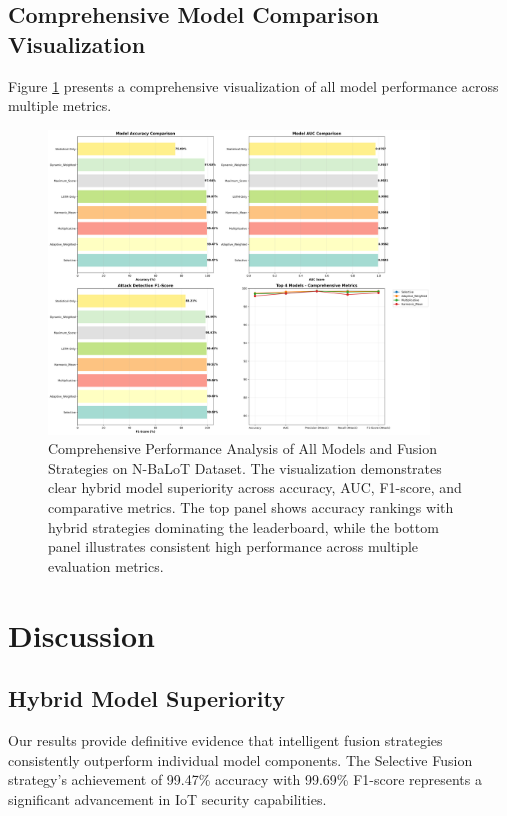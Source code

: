 \documentclass[conference]{IEEEtran}
\begin{document}
\subsection{Comprehensive Model Comparison Visualization}

Figure \ref{fig:nbalot_results} presents a comprehensive visualization of all model performance across multiple metrics.

\begin{figure}[!t]
\centering
\includegraphics[width=0.9\textwidth]{comprehensive_hybrid_results.png}
\caption{Comprehensive Performance Analysis of All Models and Fusion Strategies on N-BaLoT Dataset. The visualization demonstrates clear hybrid model superiority across accuracy, AUC, F1-score, and comparative metrics. The top panel shows accuracy rankings with hybrid strategies dominating the leaderboard, while the bottom panel illustrates consistent high performance across multiple evaluation metrics.}
\label{fig:nbalot_results}
\end{figure}

\section{Discussion}

\subsection{Hybrid Model Superiority}

Our results provide definitive evidence that intelligent fusion strategies consistently outperform individual model components. The Selective Fusion strategy's achievement of 99.47\% accuracy with 99.69\% F1-score represents a significant advancement in IoT security capabilities.
\end{document}
